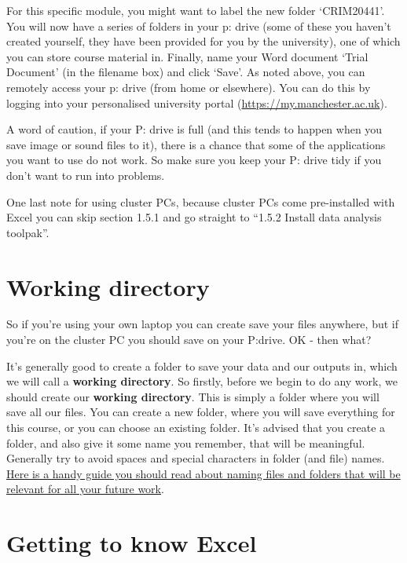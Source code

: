 \documentclass[
]{book}
\begin{document}
For this specific module, you might want to label the new folder `CRIM20441'. You will now have a series of folders in your p: drive (some of these you haven't created yourself, they have been provided for you by the university), one of which you can store course material in.
Finally, name your Word document `Trial Document' (in the filename box) and click `Save'. As noted above, you can remotely access your p: drive (from home or elsewhere). You can do this by logging into your personalised university portal (\url{https://my.manchester.ac.uk}).

A word of caution, if your P: drive is full (and this tends to happen when you save image or sound files to it), there is a chance that some of the applications you want to use do not work. So make sure you keep your P: drive tidy if you don't want to run into problems.

One last note for using cluster PCs, because cluster PCs come pre-installed with Excel you can skip section 1.5.1 and go straight to ``1.5.2 Install data analysis toolpak''.

\hypertarget{working-directory}{%
\section{Working directory}\label{working-directory}}

So if you're using your own laptop you can create save your files anywhere, but if you're on the cluster PC you should save on your P:drive. OK - then what?

It's generally good to create a folder to save your data and our outputs in, which we will call a \textbf{working directory}. So firstly, before we begin to do any work, we should create our \textbf{working directory}. This is simply a folder where you will save all our files. You can create a new folder, where you will save everything for this course, or you can choose an existing folder. It's advised that you create a folder, and also give it some name you remember, that will be meaningful. Generally try to avoid spaces and special characters in folder (and file) names. \href{http://www2.stat.duke.edu/~rcs46/lectures_2015/01-markdown-git/slides/naming-slides/naming-slides.pdf}{Here is a handy guide you should read about naming files and folders that will be relevant for all your future work}.

\hypertarget{getting-to-know-excel}{%
\section{Getting to know Excel}\label{getting-to-know-excel}}
\end{document}
